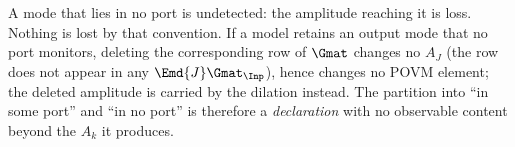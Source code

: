 
\begin{remark}
\label{rem:unmonitored}
A mode that lies in no port is undetected: the amplitude reaching it is loss.
Nothing is lost by that convention. If a model retains an output mode that no
port monitors, deleting the corresponding row of $\Gmat$ changes no $A_J$
(the row does not appear in any $\Emd{J}\Gmat_{\Inp}$), hence changes no POVM
element; the deleted amplitude is carried by the dilation instead. The
partition into ``in some port'' and ``in no port'' is therefore a
\emph{declaration} with no observable content beyond the $A_k$ it produces.
\end{remark}
